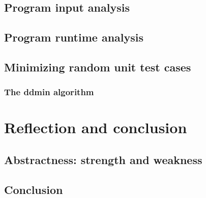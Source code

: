 \documentclass[a4paper,UKenglish]{lipics-v2018}
\begin{document}
\subsection{Program input analysis}
\subsection{Program runtime analysis}
\subsection{Minimizing random unit test cases}
\subsubsection{The ddmin algorithm}

\section{Reflection and conclusion}
\subsection{Abstractness: strength and weakness}
\subsection{Conclusion}
\end{document}
